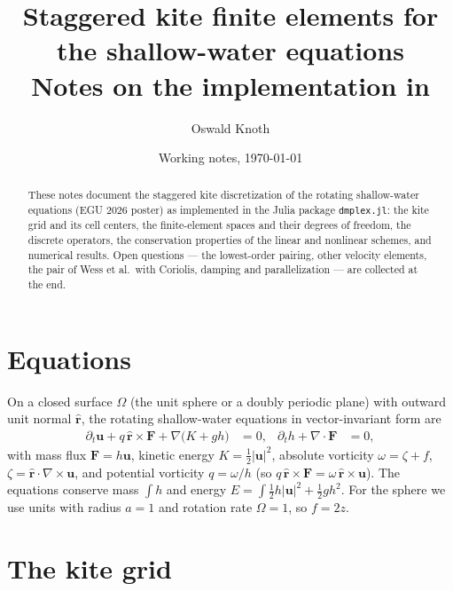 \documentclass[11pt,a4paper]{article}
\title{Staggered kite finite elements for the shallow-water equations\\[2pt]
\large Notes on the implementation in \code{dmplex.jl}}
\author{Oswald Knoth}
\date{Working notes, \today}
\newcommand{\bu}{\mathbf{u}}
\newcommand{\bF}{\mathbf{F}}
\newcommand{\rhat}{\hat{\mathbf{r}}}
\newcommand{\code}[1]{\texttt{#1}}
\begin{document}
\maketitle

\begin{abstract}
These notes document the staggered kite discretization of the rotating
shallow-water equations (EGU 2026 poster) as implemented in the Julia package
\code{dmplex.jl}: the kite grid and its cell centers, the finite-element spaces
and their degrees of freedom, the discrete operators, the conservation
properties of the linear and nonlinear schemes, and numerical results. Open
questions --- the lowest-order pairing, other velocity elements, the pair of
Wess et al.\ with Coriolis, damping and parallelization --- are collected at
the end.
\end{abstract}

\tableofcontents

\section{Equations}

On a closed surface $\Omega$ (the unit sphere or a doubly periodic plane) with
outward unit normal $\rhat$, the rotating shallow-water equations in
vector-invariant form are
\begin{align}
  \partial_t \bu + q\,\rhat\times\bF + \nabla\bigl(K + g h\bigr) &= 0, &
  \partial_t h + \nabla\cdot\bF &= 0,
\end{align}
with mass flux $\bF = h\bu$, kinetic energy $K = \tfrac12|\bu|^2$, absolute
vorticity $\omega = \zeta + f$, $\zeta = \rhat\cdot\nabla\times\bu$, and
potential vorticity $q = \omega/h$ (so $q\,\rhat\times\bF = \omega\,\rhat\times\bu$).
The equations conserve mass $\int h$ and energy
$E = \int \tfrac12 h|\bu|^2 + \tfrac12 g h^2$. For the sphere we use units with
radius $a = 1$ and rotation rate $\Omega = 1$, so $f = 2z$.

\section{The kite grid}
\end{document}
